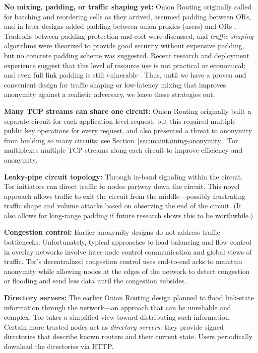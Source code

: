 \documentclass[times,10pt,twocolumn]{article}
\begin{document}
\textbf{No mixing, padding, or traffic shaping yet:} Onion
Routing originally called for batching and reordering cells as they arrived,
assumed padding between ORs, and in
later designs added padding between onion proxies (users) and ORs
\cite{or-ih96,or-jsac98}.  Tradeoffs between padding protection
and cost were discussed, and \emph{traffic shaping} algorithms were
theorized \cite{or-pet00} to provide good security without expensive
padding, but no concrete padding scheme was suggested.
Recent research \cite{econymics}
and deployment experience \cite{freedom21-security} suggest that this
level of resource use is not practical or economical; and even full
link padding is still vulnerable \cite{defensive-dropping}. Thus,
until we have a proven and convenient design for traffic shaping or
low-latency mixing that improves anonymity against a realistic
adversary, we leave these strategies out.

\textbf{Many TCP streams can share one circuit:} Onion Routing originally
built a separate circuit for each
application-level request, but this required
multiple public key operations for every request, and also presented
a threat to anonymity from building so many circuits; see
Section~\ref{sec:maintaining-anonymity}.  Tor multiplexes multiple TCP
streams along each circuit to improve efficiency and anonymity.

\textbf{Leaky-pipe circuit topology:} Through in-band signaling
within the circuit, Tor initiators can direct traffic to nodes partway
down the circuit. This novel approach
allows traffic to exit the circuit from the middle---possibly
frustrating traffic shape and volume attacks based on observing the end
of the circuit. (It also allows for long-range padding if
future research shows this to be worthwhile.)

\textbf{Congestion control:} Earlier anonymity designs do not
address traffic bottlenecks. Unfortunately, typical approaches to
load balancing and flow control in overlay networks involve inter-node
control communication and global views of traffic. Tor's decentralized
congestion control uses end-to-end acks to maintain anonymity
while allowing nodes at the edges of the network to detect congestion
or flooding and send less data until the congestion subsides.

\textbf{Directory servers:} The earlier Onion Routing design
planned to flood link-state information through the network---an approach
that can be unreliable and complex. %
Tor takes a simplified view toward distributing such
information. Certain more trusted nodes act as \emph{directory
servers}: they provide signed directories that describe known
routers and their current state. Users periodically download the
directories via HTTP.
\end{document}

